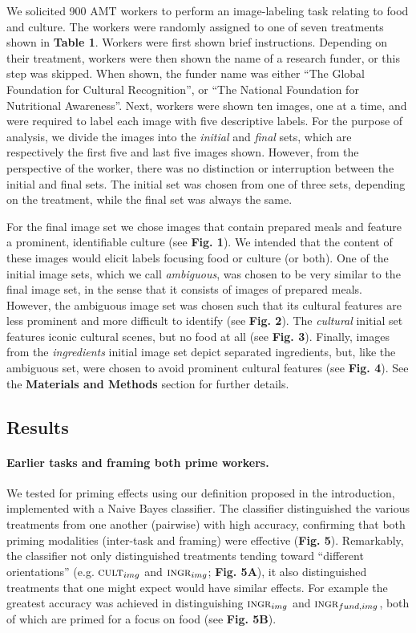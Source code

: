 \documentclass[a4paper]{report}
\begin{document}
We solicited 900 AMT workers to perform an image-labeling task relating to
food and culture.  The workers were randomly assigned to one of seven 
treatments shown in \textbf{Table 1}.  Workers were first shown brief 
instructions.  Depending on their treatment, workers were then shown the 
name of a research funder, or this step was skipped.  When shown, 
the funder name was either
``The Global Foundation for Cultural Recognition'', or 
``The National Foundation for Nutritional Awareness''.  Next, workers were
shown ten images, one at a time, and were required to label each image with
five descriptive labels.  For the purpose of analysis, we divide the images
into the \textit{initial} and \textit{final} sets, which are respectively the 
first five and last five images shown.  However, from the perspective of the 
worker, there was no 
distinction or interruption between the initial and final sets. 
The initial set was chosen from one of three sets, depending on the 
treatment, while the final set was always the same.

For the final image set we chose 
images that contain prepared meals and feature a prominent, identifiable 
culture (see \textbf{Fig. 1}).  We intended that the content of these images 
would elicit labels focusing food or culture (or both).
One of the initial image sets, which we call \textit{ambiguous}, was chosen to
be very similar to the final image set, in the sense that it consists of
images of prepared meals.  However, the ambiguous image set was chosen such 
that its cultural features are less prominent and more difficult to identify 
(see \textbf{Fig. 2}).  
The \textit{cultural} initial set features iconic cultural scenes, but no food 
at all (see \textbf{Fig. 3}).  Finally, images from
the \textit{ingredients} initial image set depict separated ingredients, but, 
like the ambiguous set, were chosen to avoid prominent cultural features (see 
\textbf{Fig. 4}).  See the \textbf{Materials and Methods} section for further 
details.

\subsection*{Results}
\paragraph{Earlier tasks and framing both prime workers.}
We tested for priming effects using our definition proposed in the 
introduction, implemented with a Naive Bayes classifier.  
The classifier distinguished the various treatments from one another (pairwise)
with high accuracy, confirming that both priming modalities 
(inter-task and framing) were effective (\textbf{Fig. 5}).  Remarkably, the 
classifier not only 
distinguished treatments tending toward ``different orientations'' 
(e.g. $\textsc{cult}_{img}$ and $\textsc{ingr}_{img}$; \textbf{Fig. 5A}), 
it also distinguished treatments that one might expect would have similar
effects.  For example the greatest accuracy was achieved in 
distinguishing $\textsc{ingr}_{img}$ and $\textsc{ingr}_{fund, img}$, both
of which are primed for a focus on food 
(see \textbf{Fig. 5B}).
\end{document}
